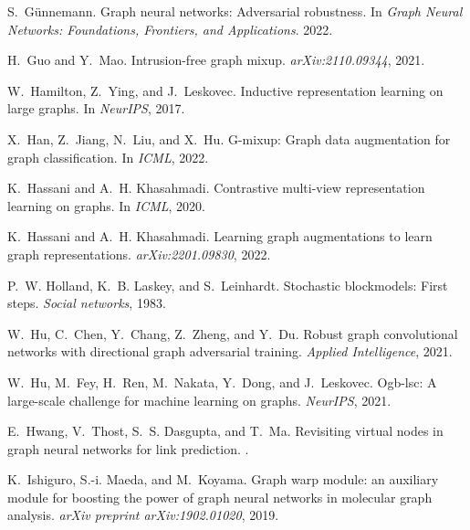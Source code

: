 \documentclass[11pt]{article}
\begin{document}
\begin{thebibliography}{10}
\begin{small}
S.~G{\"u}nnemann.
\newblock Graph neural networks: Adversarial robustness.
\newblock In \emph{Graph Neural Networks: Foundations, Frontiers, and
  Applications}. 2022.

H.~Guo and Y.~Mao.
\newblock Intrusion-free graph mixup.
\newblock \emph{arXiv:2110.09344}, 2021.

W.~Hamilton, Z.~Ying, and J.~Leskovec.
\newblock Inductive representation learning on large graphs.
\newblock In \emph{NeurIPS}, 2017.

X.~Han, Z.~Jiang, N.~Liu, and X.~Hu.
\newblock G-mixup: Graph data augmentation for graph classification.
\newblock In \emph{ICML}, 2022.

K.~Hassani and A.~H. Khasahmadi.
\newblock Contrastive multi-view representation learning on graphs.
\newblock In \emph{ICML}, 2020.

K.~Hassani and A.~H. Khasahmadi.
\newblock Learning graph augmentations to learn graph representations.
\newblock \emph{arXiv:2201.09830}, 2022.

P.~W. Holland, K.~B. Laskey, and S.~Leinhardt.
\newblock Stochastic blockmodels: First steps.
\newblock \emph{Social networks}, 1983.

W.~Hu, C.~Chen, Y.~Chang, Z.~Zheng, and Y.~Du.
\newblock Robust graph convolutional networks with directional graph
  adversarial training.
\newblock \emph{Applied Intelligence}, 2021{}.

W.~Hu, M.~Fey, H.~Ren, M.~Nakata, Y.~Dong, and J.~Leskovec.
\newblock Ogb-lsc: A large-scale challenge for machine learning on graphs.
\newblock \emph{NeurIPS}, 2021{}.

E.~Hwang, V.~Thost, S.~S. Dasgupta, and T.~Ma.
\newblock Revisiting virtual nodes in graph neural networks for link
  prediction.
.

K.~Ishiguro, S.-i. Maeda, and M.~Koyama.
\newblock Graph warp module: an auxiliary module for boosting the power of
  graph neural networks in molecular graph analysis.
\newblock \emph{arXiv preprint arXiv:1902.01020}, 2019.


\end{small}
\end{thebibliography}
\end{document}
